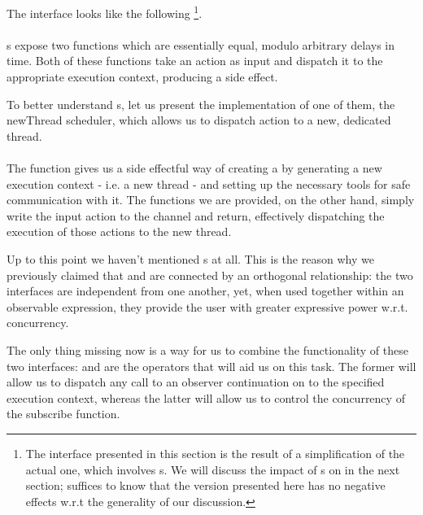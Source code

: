 The  interface looks like the following \footnote{The interface presented in this section is the result of a simplification of the actual one, which involves s. We will discuss the impact of s on  in the next section; suffices to know that the version presented here has no negative effects w.r.t the generality of our discussion.}.\\

\\

s expose two functions which are essentially equal, modulo arbitrary delays in time. Both of these functions take an  action as input and dispatch it to the appropriate execution context, producing a side effect. 

To better understand s, let us present the implementation of one of them, the newThread scheduler, which allows us to dispatch action to a new, dedicated thread.\\

\\

The  function gives us a side effectful way of creating a  by generating a new execution context - i.e. a new thread - and setting up the necessary tools for safe communication with it. The  functions we are provided, on the other hand, simply write the input  action to the channel and return, effectively dispatching the execution of those actions to the new thread. 

Up to this point we haven't mentioned s at all. This is the reason why we previously claimed that  and  are connected by an orthogonal relationship: the two interfaces are independent from one another, yet, when used together within an observable expression, they provide the user with greater expressive power w.r.t. concurrency. 

The only thing missing now is a way for us to combine the functionality of these two interfaces:  and  are the operators that will aid us on this task. The former will allow us to dispatch any call to an observer continuation on to the specified execution context, whereas the latter will allow us to control the concurrency of the  subscribe function.

